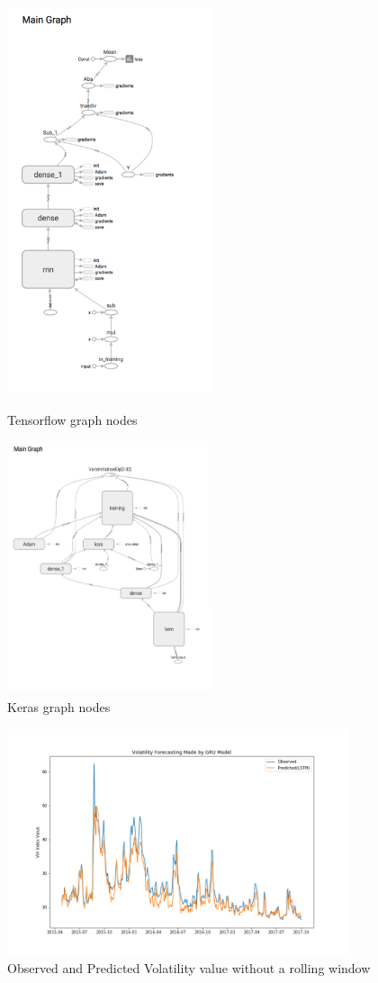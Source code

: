 \documentclass[11pt]{article}
\begin{document}
\begin{figure}[htbp]
\centering
\begin{minipage}[t]{0.48\textwidth}
\centering
\includegraphics[width=6cm]{Picture1.png}
\caption{Tensorflow graph nodes}
\end{minipage}
\begin{minipage}[t]{0.48\textwidth}
\centering
\includegraphics[width=6cm]{Picture2.png}
\caption{Keras graph nodes}
\end{minipage}
\end{figure}

\begin{figure}[htbp]
\centering
\includegraphics[width=10cm]{GRU.png}
\caption{Observed and Predicted Volatility value without a rolling window}
\end{figure}
\end{document}
